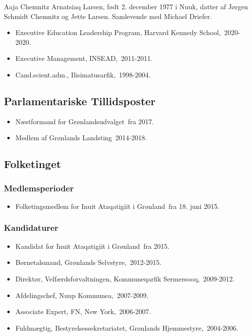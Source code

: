 \documentclass[11pt, a4paper]{awesome-cv}
\begin{document}
\makecvheader[R]
\makelettertitle
\begin{cvletter}
Aaja Chemnitz Arnatsiaq Larsen, født 2. december 1977 i Nuuk, datter af Jørgen Schmidt Chemnitz og Jette Larsen. Samlevende med Michael Driefer.

\begin{itemize}
\item Executive Education Leadership Program, Harvard Kennedy School, 2020-2020.
\item Executive Management, INSEAD, 2011-2011.
\item Cand.scient.adm., Ilisimatusarfik, 1998-2004.
\end{itemize}
\subsection*{Parlamentariske Tillidsposter}
\begin{itemize}
\item Næstformand for Grønlandsudvalget fra 2017.
\item Medlem af Grønlands Landsting 2014-2018.
\end{itemize}
\subsection*{Folketinget}
\subsubsection*{Medlemsperioder}
\begin{itemize}
\item Folketingsmedlem for Inuit Ataqatigiit i Grønland fra 18. juni 2015.
\end{itemize}
\subsubsection*{Kandidaturer}
\begin{itemize}
\item Kandidat for Inuit Ataqatigiit i Grønland fra 2015.
\end{itemize}
\begin{itemize}
\item Børnetalsmand, Grønlands Selvstyre, 2012-2015.
\item Direktør, Velfærdsforvaltningen, Kommuneqarfik Sermersooq, 2009-2012.
\item Afdelingschef, Nuup Kommunea, 2007-2009.
\item Associate Expert, FN, New York, 2006-2007.
\item Fuldmægtig, Bestyrelsessekretariatet, Grønlands Hjemmestyre, 2004-2006.
\end{itemize}
\end{cvletter}
\end{document}
